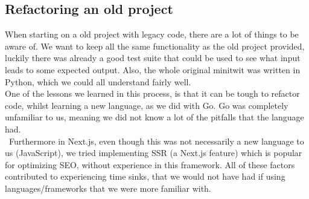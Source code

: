\subsection{Refactoring an old project}
When starting on a old project with legacy code, there are a lot of things to be aware of. We want to keep all the same functionality as the old project provided, luckily there was already a good test suite that could be used to see what input leads to some expected output. Also, the whole original minitwit was written in Python, which we could all understand fairly well. \\
One of the lessons we learned in this process, is that it can be tough to refactor code, whilst learning a new language, as we did with Go. Go was completely unfamiliar to us, meaning we did not know a lot of the pitfalls that the language had. \\\
Furthermore in Next.js, even though this was not necessarily a new language to us (JavaScript), we tried implementing SSR (a Next.js feature) which is popular for optimizing SEO, without experience in this framework. All of these factors contributed to experiencing time sinks, that we would not have had if using languages/frameworks that we were more familiar with. 
